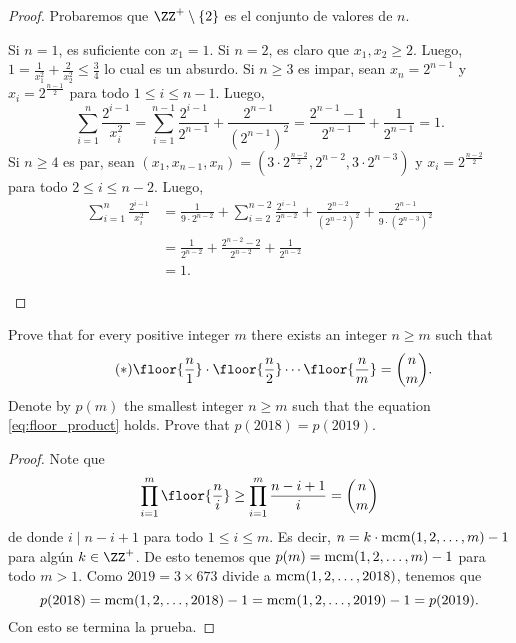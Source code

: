 \begin{proof}
	Probaremos que $\ZZ^+\setminus\{2\}$ es el conjunto de valores de $n$.
	\begin{itemize}
		\ii Si $n=1$, es suficiente con $x_1=1$.
		\ii Si $n=2$, es claro que $x_1,x_2\ge 2$. Luego, $1=\frac{1}{x_1^2}+\frac{2}{x_2^2}\le\frac34$ lo cual es un absurdo.
		\ii Si $n\ge 3$ es impar, sean $x_n=2^{n-1}$ y $x_i=2^\frac{n-1}{2}$ para todo $1\le i\le n-1$. Luego,
		\[\sum_{i=1}^n\frac{2^{i-1}}{x_i^2}=\sum_{i=1}^{n-1}\frac{2^{i-1}}{2^{n-1}}+\frac{2^{n-1}}{(2^{n-1})^2}=\frac{2^{n-1}-1}{2^{n-1}}+\frac{1}{2^{n-1}}=1.\]
		\ii Si $n\ge 4$ es par, sean $(x_1,x_{n-1},x_n)=\left(3\cdot 2^\frac{n-2}{2},2^{n-2},3\cdot 2^{n-3}\right)$ y $x_i=2^\frac{n-2}{2}$ para todo $2\le i\le n-2$. Luego,
		\begin{align*}
			\sum_{i=1}^n\frac{2^{i-1}}{x_i^2}
			&=\frac{1}{9\cdot 2^{n-2}}+\sum_{i=2}^{n-2}\frac{2^{i-1}}{2^{n-2}}+\frac{2^{n-2}}{(2^{n-2})^2}+\frac{2^{n-1}}{9\cdot(2^{n-3})^2} \\
			&=\frac{1}{2^{n-2}}+\frac{2^{n-2}-2}{2^{n-2}}+\frac{1}{2^{n-2}} \\
			&=1.
		\end{align*}
	\end{itemize}
\end{proof}

\begin{probEG}[MEMO 2018 I-4]
	\begin{enumerate}[(a)]
		\ii Prove that for every positive integer $m$ there exists an integer $n\ge m$ such that
		\begin{equation}\label{eq:floor_product}\tag{$\ast$}
			\floor{\frac n1}\cdot\floor{\frac n2}\cdots\floor{\frac nm}=\binom nm.
		\end{equation}
		\ii Denote by $p(m)$ the smallest integer $n\ge m$ such that the equation \eqref{eq:floor_product} holds. Prove that $p(2018)=p(2019)$.
	\end{enumerate}
\end{probEG}

\begin{proof}
	Note que
	\[\prod_{i=1}^m\floor{\frac ni}\ge\prod_{i=1}^m\frac{n-i+1}{i}=\binom nm\]
	de donde $i\mid n-i+1$ para todo $1\le i\le m$. Es decir, $n=k\cdot\operatorname{mcm}(1,2,\dots,m)-1$ para algún $k\in\ZZ^+$. De esto tenemos que $p(m)=\operatorname{mcm}(1,2,\dots,m)-1$ para todo $m>1$. Como $2019=3\times 673$ divide a $\operatorname{mcm}(1,2,\dots,2018)$, tenemos que
	\[p(2018)=\operatorname{mcm}(1,2,\dots,2018)-1=\operatorname{mcm}(1,2,\dots,2019)-1=p(2019).\]
	Con esto se termina la prueba.
\end{proof}


